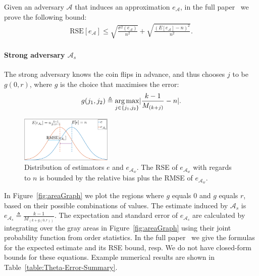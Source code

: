 Given an adversary $\mathcal{A}$ that induces an approximation $e_{\mathcal{A}}$, in the full paper~\cite{rinberg2019fast} we prove
the following bound:
\begin{align*}
    \text{RSE}[e_{\mathcal{A}}] \leq \sqrt{\frac{\sigma^2(e_{\mathcal{A}})}{n^2}} + \sqrt{\frac{(E[e_{\mathcal{A}}] - n)^2}{n^2}}.
\end{align*}

\paragraph{Strong adversary ${\mathcal{A}}_s$} The strong adversary knows the coin flips in advance, and thus chooses
$j$ to be $g(0, r)$, where $g$ is the
choice that maximises the error:
\begin{align*}
    g(j_1, j_2) \triangleq \operatorname*{arg\,max}_{j \in \left\{j_1, j_2\right\}} \lvert\frac{k-1}{M_{(k+j)}} - n\rvert.
\end{align*} 

\begin{figure}[b]
    \begin{center}
        \includegraphics[width=0.39\textwidth]{images/thetaGraph.png}
    \end{center}
    \caption{Distribution of estimators $e$ and $e_{{\mathcal{A}}_w}$. The RSE of $e_{{\mathcal{A}}_w}$ with regards to $n$ is bounded
    by the relative bias plus the RMSE of $e_{{\mathcal{A}}_w}$.}%
    \label{fig:thetaGraph}
\end{figure}

In Figure~\ref{fig:areaGraph} we plot the regions where $g$ equals $0$
and $g$ equals $r$, based on their possible combinations of values. The estimate
induced by ${\mathcal{A}}_s$ is $e_{{\mathcal{A}}_s} \triangleq \frac{k-1}{M_{(k+g(0,r))}}$. The expectation
and standard error of $e_{{\mathcal{A}}_s}$ are calculated by integrating over the gray areas
in Figure~\ref{fig:areaGraph}
using their joint probability function from order statistics. In the full paper~\cite{rinberg2019fast} we give
the formulas for the expected estimate and its RSE bound, resp. We do not have
closed-form bounds for these equations. Example numerical results are
shown in Table~\ref{table:Theta-Error-Summary}.

